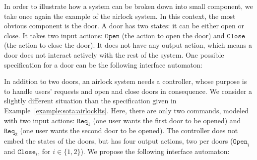 \begin{example}
  In order to illustrate how a system can be broken down into small component,
  we take once again the example of the airlock system.
  In this context, the most obvious component is the door.
  A door has two states: it can be either open or close.
  It takes two input actions: \( \mathtt{Open} \) (the action to open the door)
  and \( \mathtt{Close} \) (the action to close the door).
  It does not have any output action, which means a door does not interact
  actively with the rest of the system.
  One possible specification for a door can be the following interface
  automaton:

  \begin{center}
  \end{center}

  In addition to two doors, an airlock system needs a controller, whose purpose
  is to handle users' requests and open and close doors in consequence.
  We consider a slightly different situation than the specification given in
  Example~\ref{example:sota:airlocklts}.
  Here, there are only two commands, modeled with two input actions:
  \( \mathtt{Req}_1 \) (one user wants the first door to be opened) and
  \( \mathtt{Req}_2 \) (one user wants the second door to be opened).
  The controller does not embed the states of the doors, but has four output
  actions, two per doors (\( \mathtt{Open}_i \) and \( \mathtt{Close}_i\), for
  \( i \in \{1, 2\}\)).
  We propose the following interface automaton:


\end{example}

